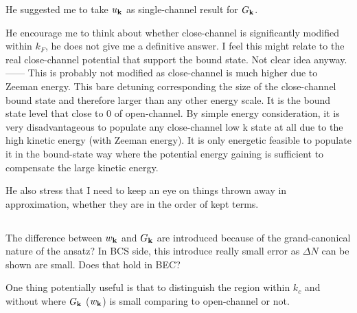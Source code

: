 He suggested me to take $u_{\mathbf{k}}$ as single-channel result for $G_{\mathbf{k}}$.   

He encourage me to think about whether close-channel is significantly modified within $k_{F}$, he does not give me a definitive answer.  I feel this might relate to the real close-channel potential that support the bound state.  Not clear idea anyway.  
------ This is probably not modified as close-channel is much higher due to Zeeman energy.  This bare detuning corresponding the size of the close-channel bound state and therefore larger than any other energy scale.   It is the bound state level that close to 0 of open-channel.  By simple energy consideration, it is very disadvantageous to populate any close-channel low k state at all due to the high kinetic energy (with Zeeman energy).  It is only energetic feasible to populate it in the bound-state way where the potential energy gaining is sufficient to compensate the large kinetic energy.  

He also stress that I need to keep an eye on things thrown away in approximation,  whether they are in the order of kept terms.  

\subsection{}
The difference between $w_{\mathbf{k}}$ and $G_{\mathbf{k}}$ are introduced because of the grand-canonical nature of the ansatz?  In BCS side, this introduce really small error as $\Delta{N}$ can be shown are small.  Does that hold in BEC?

One thing potentially useful is that to distinguish the region within $k_{c}$ and without where $G_{\mathbf{k}}$ ($w_{\mathbf{k}}$) is small comparing to open-channel or not.  